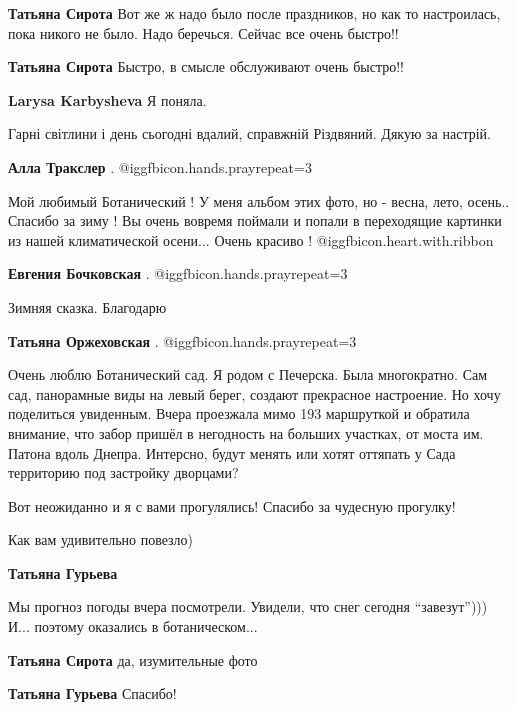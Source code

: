 \begin{itemize}
\begin{itemize}
\textbf{Татьяна Сирота} Вот же ж надо было после праздников, но как то настроилась, пока никого не было. Надо беречься. Сейчас все очень быстро!!

\textbf{Татьяна Сирота} Быстро, в смысле обслуживают очень быстро!!

\textbf{Larysa Karbysheva} Я поняла.
\end{itemize} %

Гарні світлини і день сьогодні вдалий, справжній Різдвяний.
Дякую за настрій.

\textbf{Алла Тракслер} . @igg{fbicon.hands.pray}{repeat=3} 


Мой любимый Ботанический !
У меня альбом этих фото, но - весна, лето, осень..
Спасибо за зиму !
Вы очень вовремя поймали и попали в переходящие картинки из нашей климатической осени... Очень красиво !  @igg{fbicon.heart.with.ribbon} 

\textbf{Евгения Бочковская} . @igg{fbicon.hands.pray}{repeat=3} 

Зимняя сказка. Благодарю

\textbf{Татьяна Оржеховская} . @igg{fbicon.hands.pray}{repeat=3} 


Очень люблю Ботанический сад. Я родом с Печерска. Была многократно. Сам
сад, панорамные виды на левый берег, создают прекрасное настроение. Но хочу
поделиться увиденным. Вчера проезжала мимо 193 маршруткой и обратила
внимание, что забор пришёл в негодность на больших участках, от моста им. Патона
вдоль Днепра. Интерсно, будут менять или хотят оттяпать у Сада территорию под
застройку дворцами?


Вот неожиданно и я с вами прогулялись! Спасибо за чудесную прогулку!

Как вам удивительно повезло)

\begin{itemize} %
\textbf{Татьяна Гурьева} 

Мы прогноз погоды вчера посмотрели.
Увидели, что снег сегодня \enquote{завезут})))
И... поэтому оказались в ботаническом...

\textbf{Татьяна Сирота} да, изумительные фото

\textbf{Татьяна Гурьева} Спасибо!
\end{itemize} %


\end{itemize}
